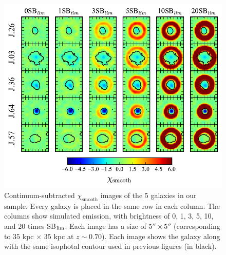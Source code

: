 \documentclass[twocolumn]{aastex61}
\begin{document}
\begin{figure}[p]
\centering
\includegraphics[scale=1.2]{sigmas.pdf}
\caption{Continuum-subtracted $\chi_{\text{smooth}}$ images of the 5 galaxies in our sample. Every galaxy is placed in the same row in each column. The columns show simulated emission, with brightness of 0, 1, 3, 5, 10, and 20 times SB$_{\rm lim}$.  Each image has a size of $5'' \times 5''$ (corresponding to $35$ kpc $\times$ $35$ kpc at $z\sim 0.70$). Each image shows the galaxy along with the same isophotal contour used in previous figures (in black).}
\label{fig:sigmas}
\end{figure}
\end{document}
